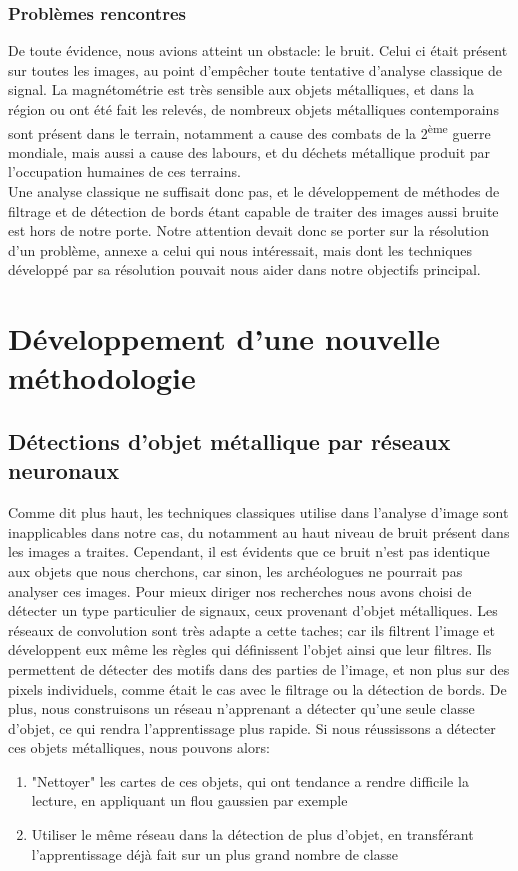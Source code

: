 \documentclass[a4paper, 12pt, titlepage, oneside, french]{article}
\begin{document}
	\subsubsection{Problèmes rencontres}
	De toute évidence, nous avions atteint un obstacle: le bruit. Celui ci était présent sur toutes les images, au point d'empêcher toute tentative d'analyse classique de signal. La magnétométrie est très sensible aux objets métalliques, et dans la région ou ont été fait les relevés, de nombreux objets métalliques contemporains sont présent dans le terrain, notamment a cause des combats de la 2\textsuperscript{ème} guerre mondiale, mais aussi a cause des labours, et du déchets métallique produit par l'occupation humaines de ces terrains.\\
	Une analyse classique ne suffisait donc pas, et le développement de méthodes de filtrage et de détection de bords étant capable de traiter des images aussi bruite est hors de notre porte. Notre attention devait donc se porter sur la résolution d'un problème, annexe a celui qui nous intéressait, mais dont les techniques développé par sa résolution pouvait nous aider dans notre objectifs principal.

\newpage
\section{Développement d'une nouvelle méthodologie}
	\subsection{Détections d'objet métallique par réseaux neuronaux}
	Comme dit plus haut, les techniques classiques utilise dans l'analyse d'image sont inapplicables dans notre cas, du notamment au haut niveau de bruit présent dans les images a traites. Cependant, il est évidents que ce bruit n'est pas identique aux objets que nous cherchons, car sinon, les archéologues ne pourrait pas analyser ces images. Pour mieux diriger nos recherches nous avons choisi de détecter un type particulier de signaux, ceux provenant d'objet métalliques. Les réseaux de convolution sont très adapte a cette taches; car ils filtrent l'image et développent eux même les règles qui définissent l'objet ainsi que leur filtres. Ils permettent de détecter des motifs dans des parties de l'image, et non plus sur des pixels individuels, comme était le cas avec le filtrage ou la détection de bords. De plus, nous construisons un réseau n'apprenant a détecter qu'une seule classe d'objet, ce qui rendra l'apprentissage plus rapide. Si nous réussissons a détecter ces objets métalliques, nous pouvons alors:
	\begin{enumerate}
		\item "Nettoyer" les cartes de ces objets, qui ont tendance a rendre difficile la lecture, en appliquant un flou gaussien par exemple
		\item Utiliser le même réseau dans la détection de plus d'objet, en transférant l'apprentissage déjà fait sur un plus grand nombre de classe
	\end{enumerate}
\end{document}
